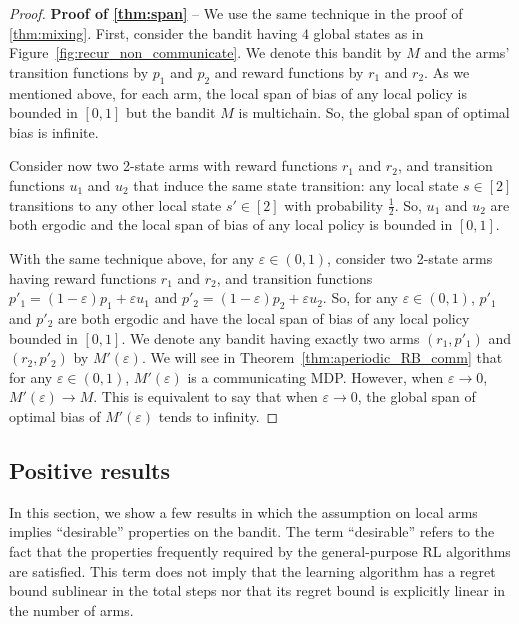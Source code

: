 \begin{proof}
    \textbf{Proof of \ref{thm:span}} -- We use the same technique in the proof of \ref{thm:mixing}.
    First, consider the bandit having $4$ global states as in Figure~\ref{fig:recur_non_communicate}.
    We denote this bandit by $M$ and the arms' transition functions by $p_1$ and $p_2$ and reward functions by $r_1$ and $r_2$.
    As we mentioned above, for each arm, the local span of bias of any local policy is bounded in $[0,1]$ but the bandit $M$ is multichain.
    So, the global span of optimal bias is infinite.

    Consider now two 2-state arms with reward functions $r_1$ and $r_2$, and transition functions $u_1$ and $u_2$ that induce the same state transition: any local state $s\in[2]$ transitions to any other local state $s'\in[2]$ with probability $\frac12$.
    So, $u_1$ and $u_2$ are both ergodic and the local span of bias of any local policy is bounded in $[0,1]$.

    With the same technique above, for any $\varepsilon\in(0,1)$, consider two 2-state arms having reward functions $r_1$ and $r_2$, and transition functions $p'_1=(1-\varepsilon)p_1+\varepsilon u_1$ and $p'_2=(1-\varepsilon)p_2+\varepsilon u_2$.
    So, for any $\varepsilon\in(0,1)$, $p'_1$ and $p'_2$ are both ergodic and have the local span of bias of any local policy bounded in $[0,1]$.
    We denote any bandit having exactly two arms $(r_1,p'_1)$ and $(r_2,p'_2)$ by $M'(\varepsilon)$.
    We will see in Theorem~\ref{thm:aperiodic_RB_comm} that for any $\varepsilon\in(0,1)$, $M'(\varepsilon)$ is a communicating MDP.
    However, when $\varepsilon\to0$, $M'(\varepsilon)\to M$.
    This is equivalent to say that when $\varepsilon\to0$, the global span of optimal bias of $M'(\varepsilon)$ tends to infinity.
\end{proof}

\subsection{Positive results}

In this section, we show a few results in which the assumption on local arms implies ``desirable'' properties on the bandit.
The term ``desirable'' refers to the fact that the properties frequently required by the general-purpose RL algorithms are satisfied.
This term does not imply that the learning algorithm has a regret bound sublinear in the total steps nor that its regret bound is explicitly linear in the number of arms.

